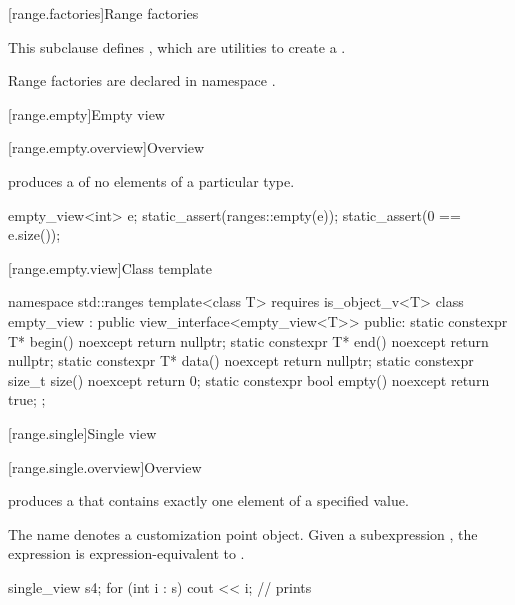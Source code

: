 [range.factories]{Range factories}

\pnum
This subclause defines ,
which are utilities to create a .

\pnum
Range factories are declared in namespace .

[range.empty]{Empty view}

[range.empty.overview]{Overview}

\pnum
{} produces a  of no elements of
a particular type.

\pnum
\begin{example}
\begin{codeblock}
empty_view<int> e;
static_assert(ranges::empty(e));
static_assert(0 == e.size());
\end{codeblock}
\end{example}

[range.empty.view]{Class template }

%
\begin{codeblock}
namespace std::ranges {
  template<class T>
    requires is_object_v<T>
  class empty_view : public view_interface<empty_view<T>> {
  public:
    static constexpr T* begin() noexcept { return nullptr; }
    static constexpr T* end() noexcept { return nullptr; }
    static constexpr T* data() noexcept { return nullptr; }
    static constexpr size_t size() noexcept { return 0; }
    static constexpr bool empty() noexcept { return true; }
  };
}
\end{codeblock}

[range.single]{Single view}

[range.single.overview]{Overview}

\pnum
{} produces a  that contains
exactly one element of a specified value.

\pnum
The name  denotes a
customization point object.
Given a subexpression , the expression
 is expression-equivalent to
.

\pnum
\begin{example}
\begin{codeblock}
single_view s{4};
for (int i : s)
  cout << i;        // prints 
\end{codeblock}
\end{example}

